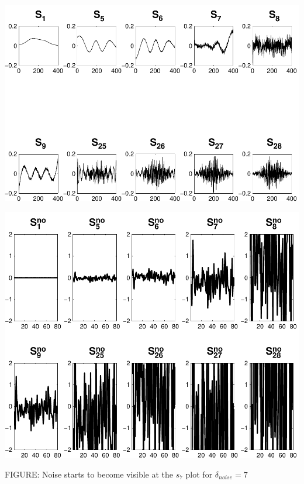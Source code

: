 \documentclass[11pt]{amsart}
\begin{document}
	\vspace{5mm}
	\begin{minipage}[t]{0.5\textwidth}
	
		\includegraphics[width=.95\linewidth]{figures/run3/sk_plots} 
   
	\end{minipage}
	\begin{minipage}[t]{0.5\textwidth}
	
		\includegraphics[width=.75\linewidth]{figures/run3/noise_parts} 
   
	\end{minipage}
	\begin{center}
		FIGURE: 
		Noise starts to become visible at the $s_{7}$ plot for $\delta_{noise}=7$
	\end{center} 
	\vspace{10mm}
	
\end{document}
